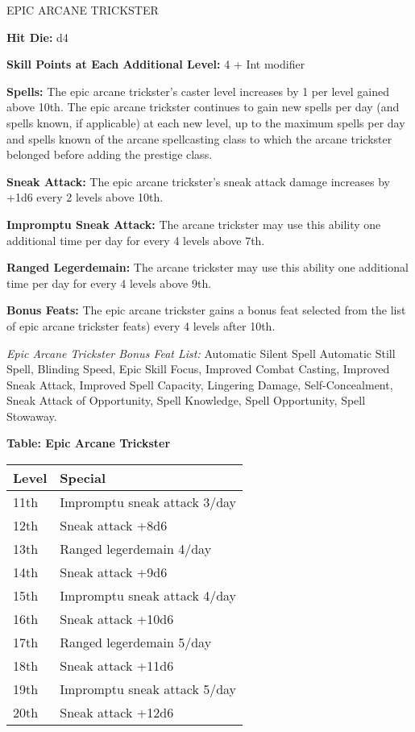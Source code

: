 \documentclass{article}
\begin{document}
\vspace{12pt}
{\LARGE{}EPIC ARCANE TRICKSTER}

\textbf{Hit Die: }d4

\textbf{Skill Points at Each Additional Level: }4 + Int modifier

\textbf{Spells: }The epic arcane trickster's caster level increases by 1 per level 
gained above 10th. The epic arcane trickster continues to gain new spells per day 
(and spells known, if applicable) at each new level, up to the maximum spells per 
day and spells known of the arcane spellcasting class to which the arcane trickster 
belonged before adding the prestige class.

\textbf{Sneak Attack: }The epic arcane trickster's sneak attack damage increases 
by +1d6 every 2 levels above 10th.

\textbf{Impromptu Sneak Attack: }The arcane trickster may use this ability one 
additional time per day for every 4 levels above 7th.

\textbf{Ranged Legerdemain: }The arcane trickster may use this ability one additional 
time per day for every 4 levels above 9th.

\textbf{Bonus Feats: }The epic arcane trickster gains a bonus feat selected from 
the list of epic arcane trickster feats) every 4 levels after 10th.

\textit{Epic Arcane Trickster Bonus Feat List: }Automatic Silent Spell Automatic 
Still Spell, Blinding Speed, Epic Skill Focus, Improved Combat Casting, Improved 
Sneak Attack, Improved Spell Capacity, Lingering Damage, Self-Concealment, Sneak 
Attack of Opportunity, Spell Knowledge, Spell Opportunity, Spell Stowaway.

\textbf{Table: Epic Arcane Trickster}

\begin{tabular}{|>{\raggedright}p{27pt}|>{\raggedright}p{125pt}|}
\hline
L\textbf{evel} & S\textbf{pecial}\tabularnewline
\hline
11th & Impromptu sneak attack 3/day\tabularnewline
\hline
12th & Sneak attack +8d6\tabularnewline
\hline
13th & Ranged legerdemain 4/day\tabularnewline
\hline
14th & Sneak attack +9d6\tabularnewline
\hline
15th & Impromptu sneak attack 4/day\tabularnewline
\hline
16th & Sneak attack +10d6\tabularnewline
\hline
17th & Ranged legerdemain 5/day\tabularnewline
\hline
18th & Sneak attack +11d6\tabularnewline
\hline
19th & Impromptu sneak attack 5/day\tabularnewline
\hline
20th & Sneak attack +12d6\tabularnewline
\hline
\end{tabular}
\end{document}
